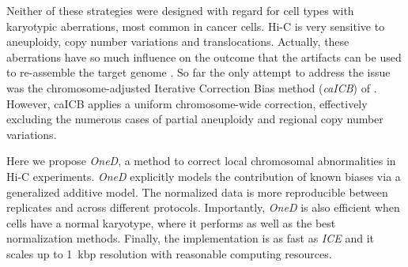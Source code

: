 \documentclass{bioinfo}
\begin{document}
Neither of these strategies were designed with regard for cell types with
karyotypic aberrations, most common in cancer cells. Hi-C is very
sensitive to aneuploidy, copy number variations and translocations.
Actually, these aberrations have so much influence on the outcome that the
artifacts can be used to re-assemble the target genome
\citep{korbel2013genome}. So far the only attempt to address the issue
was the chromosome-adjusted Iterative Correction Bias method
(\textit{caICB}) of \cite{wu2016computational}.  However, caICB applies a
uniform chromosome-wide correction, effectively excluding the numerous
cases of partial aneuploidy and regional copy number variations.

Here we propose \textit{OneD}, a method to correct local chromosomal
abnormalities in Hi-C experiments. \textit{OneD} explicitly models the
contribution of known biases via a generalized additive model. The
normalized data is more reproducible between replicates and across
different protocols. Importantly, \textit{OneD} is also efficient when
cells have a normal karyotype, where it performs as well as the best
normalization methods. Finally, the implementation is as fast as
\textit{ICE} and it scales up to 1~kbp resolution with reasonable
computing resources.

\end{document}
